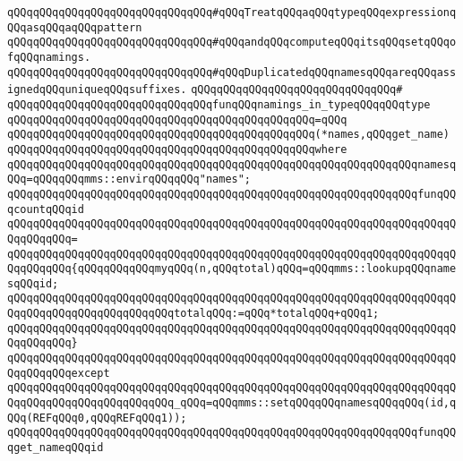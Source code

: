 \verb|qQQqqQQqqQQqqQQqqQQqqQQqqQQqqQQq#qQQqTreatqQQqaqQQqtypeqQQqexpressionqQQqasqQQqaqQQqpattern|\newline
\verb|qQQqqQQqqQQqqQQqqQQqqQQqqQQqqQQq#qQQqandqQQqcomputeqQQqitsqQQqsetqQQqofqQQqnamings.|\newline
\verb|qQQqqQQqqQQqqQQqqQQqqQQqqQQqqQQq#qQQqDuplicatedqQQqnamesqQQqareqQQqassignedqQQquniqueqQQqsuffixes.|\newline
\verb|qQQqqQQqqQQqqQQqqQQqqQQqqQQqqQQq#|\newline
\verb|qQQqqQQqqQQqqQQqqQQqqQQqqQQqqQQqfunqQQqnamings_in_typeqQQqqQQqtype|\newline
\verb|qQQqqQQqqQQqqQQqqQQqqQQqqQQqqQQqqQQqqQQqqQQqqQQq=qQQq|\newline
\verb|qQQqqQQqqQQqqQQqqQQqqQQqqQQqqQQqqQQqqQQqqQQqqQQq(*names,qQQqget_name)|\newline
\verb|qQQqqQQqqQQqqQQqqQQqqQQqqQQqqQQqqQQqqQQqqQQqqQQqwhere|\newline
\verb|qQQqqQQqqQQqqQQqqQQqqQQqqQQqqQQqqQQqqQQqqQQqqQQqqQQqqQQqqQQqqQQqnamesqQQq=qQQqqQQqmms::envirqQQqqQQq"names";|\newline
\newline
\verb|qQQqqQQqqQQqqQQqqQQqqQQqqQQqqQQqqQQqqQQqqQQqqQQqqQQqqQQqqQQqqQQqfunqQQqcountqQQqid|\newline
\verb|qQQqqQQqqQQqqQQqqQQqqQQqqQQqqQQqqQQqqQQqqQQqqQQqqQQqqQQqqQQqqQQqqQQqqQQqqQQqqQQq=|\newline
\verb|qQQqqQQqqQQqqQQqqQQqqQQqqQQqqQQqqQQqqQQqqQQqqQQqqQQqqQQqqQQqqQQqqQQqqQQqqQQqqQQq{qQQqqQQqqQQqmyqQQq(n,qQQqtotal)qQQq=qQQqmms::lookupqQQqnamesqQQqid;|\newline
\verb|qQQqqQQqqQQqqQQqqQQqqQQqqQQqqQQqqQQqqQQqqQQqqQQqqQQqqQQqqQQqqQQqqQQqqQQqqQQqqQQqqQQqqQQqqQQqqQQqtotalqQQq:=qQQq*totalqQQq+qQQq1;|\newline
\verb|qQQqqQQqqQQqqQQqqQQqqQQqqQQqqQQqqQQqqQQqqQQqqQQqqQQqqQQqqQQqqQQqqQQqqQQqqQQqqQQq}|\newline
\verb|qQQqqQQqqQQqqQQqqQQqqQQqqQQqqQQqqQQqqQQqqQQqqQQqqQQqqQQqqQQqqQQqqQQqqQQqqQQqqQQqexcept|\newline
\verb|qQQqqQQqqQQqqQQqqQQqqQQqqQQqqQQqqQQqqQQqqQQqqQQqqQQqqQQqqQQqqQQqqQQqqQQqqQQqqQQqqQQqqQQqqQQqqQQq_qQQq=qQQqmms::setqQQqqQQqnamesqQQqqQQq(id,qQQq(REFqQQq0,qQQqREFqQQq1));|\newline
\newline
\newline
\verb|qQQqqQQqqQQqqQQqqQQqqQQqqQQqqQQqqQQqqQQqqQQqqQQqqQQqqQQqqQQqqQQqfunqQQqget_nameqQQqid|\newline
